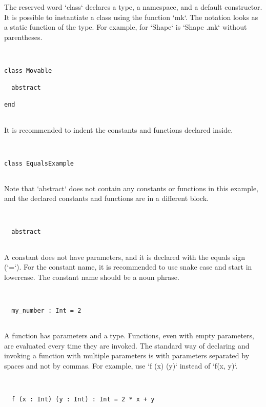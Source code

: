 \documentclass[12pt,a4paper]{article}
\begin{document}
The reserved word `class` declares a type, a namespace, and a default constructor.
 It is possible to instantiate a class using the function `mk`. The notation looks
 as a static function of the type. For example, for `Shape` is `Shape .mk` without
 parentheses.


\begin{lstlisting}


class Movable

  abstract

end


\end{lstlisting}

It is recommended to indent the constants and functions declared inside.


\begin{lstlisting}


class EqualsExample


\end{lstlisting}

  Note that `abstract` does not contain any constants or functions in this example, and the
   declared constants and functions are in a different block.


\begin{lstlisting}


  abstract


\end{lstlisting}

  A constant does not have parameters, and it is declared with the equals sign (`=`).
   For the constant name, it is recommended to use snake case and start in lowercase.
   The constant name should be a noun phrase.


\begin{lstlisting}


  my_number : Int = 2


\end{lstlisting}

  A function has parameters and a type. Functions, even with empty parameters, are evaluated
   every time they are invoked. The standard way of declaring and invoking a function
   with multiple parameters is with parameters separated by spaces and not by commas.
   For example, use `f (x) (y)` instead of `f(x, y)`.


\begin{lstlisting}


  f (x : Int) (y : Int) : Int = 2 * x + y


\end{lstlisting}
\end{document}
